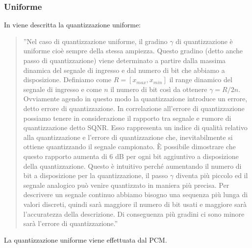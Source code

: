 \documentclass[a4paper]{report} %
\begin{document}
\subsubsection{Uniforme}
In \cite{art:rif.4} viene descritta la quantizzazione uniforme:
\begin{quote}
	''Nel caso di quantizzazione uniforme, il gradino $\gamma$ di quantizzazione è uniforme cioè sempre della stessa ampiezza. Questo gradino (detto anche passo di quantizzazione) viene determinato a partire dalla massima dinamica del segnale di ingresso e dal numero di bit che abbiamo a disposizione. Definiamo come $R=[x_{max},x_{min}]$ il range dinamico del segnale di ingresso e come $n$ il numero di bit così da ottenere $\gamma=R/2n$. Ovviamente agendo in questo modo la quantizzazione introduce un errore, detto errore di quantizzazione. In correlazione all'errore di quantizzazione possiamo tenere in considerazione il rapporto tra segnale e rumore di quantizzazione detto SQNR. Esso rappresenta un indice di qualità relativo alla quantizzazione e l'errore di quantizzazione che, inevitabilmente si ottiene quantizzando il segnale campionato. È possibile dimostrare che questo rapporto aumenta di 6 dB per ogni bit aggiuntivo a disposizione della quantizzazione. Questo è intuitivo perché aumentando il numero di bit a disposizione per la quantizzazione, il passo $\gamma$ diventa più piccolo ed il segnale analogico può venire quantizzato in maniera più precisa. Per descrivere un segnale continuo abbiamo bisogno una sequenza più lunga di valori discreti, quindi sarà maggiore il numero di bit usati e maggiore sarà l'accuratezza della descrizione. Di conseguenza più gradini ci sono minore sarà l'errore di quantizzazione.''   
\end{quote}
La quantizzazione uniforme viene effettuata dal PCM.
\end{document}
